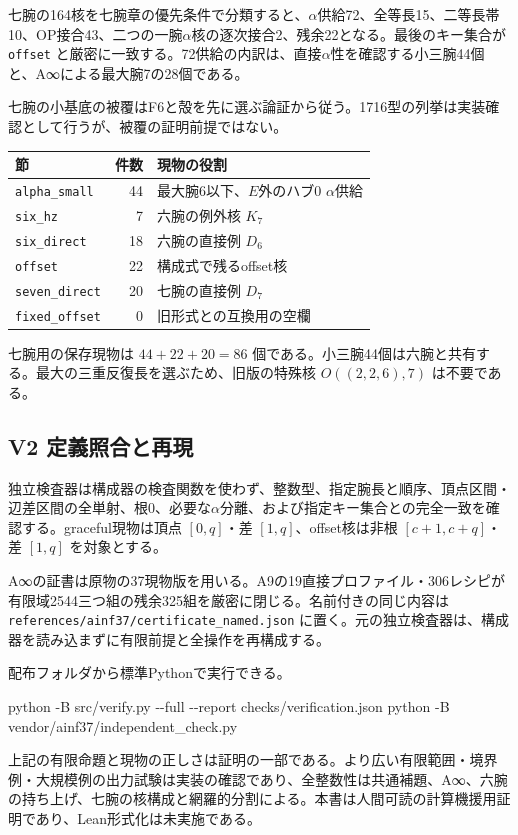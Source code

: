 \documentclass[
  10pt,
  a4paper,
]{article}
\newenvironment{Shaded}{}{}
\newcommand{\NormalTok}[1]{#1}
\begin{document}
七腕の164核を七腕章の優先条件で分類すると、\(\alpha\)供給72、全等長15、二等長帯10、OP接合43、二つの一腕\(\alpha\)核の逐次接合2、残余22となる。最後のキー集合が
\texttt{offset}
と厳密に一致する。72供給の内訳は、直接\(\alpha\)性を確認する小三腕44個と、A∞による最大腕7の28個である。

七腕の小基底の被覆はF6と殻を先に選ぶ論証から従う。1716型の列挙は実装確認として行うが、被覆の証明前提ではない。

\begin{longtable}[]{@{}lrl@{}}
\toprule\noalign{}
節 & 件数 & 現物の役割 \\
\midrule\noalign{}
\endhead
\bottomrule\noalign{}
\endlastfoot
\texttt{alpha\_small} & 44 & 最大腕6以下、\(E\)外のハブ0
\(\alpha\)供給 \\
\texttt{six\_hz} & 7 & 六腕の例外核 \(K_7\) \\
\texttt{six\_direct} & 18 & 六腕の直接例 \(D_6\) \\
\texttt{offset} & 22 & 構成式で残るoffset核 \\
\texttt{seven\_direct} & 20 & 七腕の直接例 \(D_7\) \\
\texttt{fixed\_offset} & 0 & 旧形式との互換用の空欄 \\
\end{longtable}

七腕用の保存現物は \(44+22+20=86\)
個である。小三腕44個は六腕と共有する。最大の三重反復長を選ぶため、旧版の特殊核
\(O((2,2,6),7)\) は不要である。

\subsection{V2
定義照合と再現}\label{v2-ux5b9aux7fa9ux7167ux5408ux3068ux518dux73fe}

独立検査器は構成器の検査関数を使わず、整数型、指定腕長と順序、頂点区間・辺差区間の全単射、根0、必要な\(\alpha\)分離、および指定キー集合との完全一致を確認する。graceful現物は頂点
\([0,q]\)・差 \([1,q]\)、offset核は非根 \([c+1,c+q]\)・差 \([1,q]\)
を対象とする。

A∞の証書は原物の37現物版を用いる。A9の19直接プロファイル・306レシピが有限域2544三つ組の残余325組を厳密に閉じる。名前付きの同じ内容は
\texttt{references/ainf37/certificate\_named.json}
に置く。元の独立検査器は、構成器を読み込まずに有限前提と全操作を再構成する。

配布フォルダから標準Pythonで実行できる。

\begin{Shaded}
\begin{Highlighting}[]
\NormalTok{python {-}B src/verify.py {-}{-}full {-}{-}report checks/verification.json}
\NormalTok{python {-}B vendor/ainf37/independent\_check.py}
\end{Highlighting}
\end{Shaded}

上記の有限命題と現物の正しさは証明の一部である。より広い有限範囲・境界例・大規模例の出力試験は実装の確認であり、全整数性は共通補題、A∞、六腕の持ち上げ、七腕の核構成と網羅的分割による。本書は人間可読の計算機援用証明であり、Lean形式化は未実施である。
\end{document}
